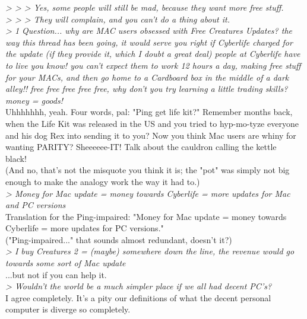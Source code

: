 \documentclass[11pt,twoside,a4paper]{article}
\begin{document}
\begin{multicols*}{2}
\emph{> > > Yes, some people will still be mad, because they want more free stuff.}~\\
\emph{> > > They will complain, and you can't do a thing about it.}~\\

\emph{> 1 Question... why are MAC users obsessed with Free Creatures Updates? the way this thread has been going, it would serve you right if Cyberlife charged for the update (if they provide it, which I doubt a great deal) people at Cyberlife have to live you know! you can't expect them to work 12 hours a day, making free stuff for your MACs, and then go home to a Cardboard box in the middle of a dark alley!! free free free free free, why don't you try learning a little trading skills? money = goods!}~\\

Uhhhhhhh, yeah. Four words, pal: "Ping get life kit?" Remember months back, when the Life Kit was released in the US and you tried to hyp-mo-tyze everyone and his dog Rex into sending it to you? Now you think Mac users are whiny for wanting PARITY? Sheeeeee-IT! Talk about the cauldron calling the kettle black!~\\

(And no, that's not the misquote you think it is; the "pot" was simply not big enough to make the analogy work the way it had to.)~\\

\emph{> Money for Mac update = money towards Cyberlife = more updates for Mac and PC versions}~\\

Translation for the Ping-impaired: "Money for Mac update = money towards Cyberlife = more updates for PC versions."~\\

("Ping-impaired..." that sounds almost redundant, doesn't it?)~\\

\emph{> I buy Creatures 2 = (maybe) somewhere down the line, the revenue would go towards some sort of Mac update}~\\

...but not if you can help it.~\\

\emph{> Wouldn't the world be a much simpler place if we all had decent PC's?}~\\

I agree completely. It's a pity our definitions of what the decent personal computer is diverge so completely.~\\


\end{multicols*}
\end{document}
